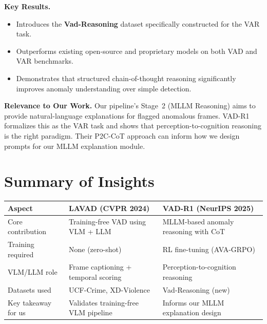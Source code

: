 \documentclass[12pt, a4paper]{article}
\begin{document}
\textbf{Key Results.}
\begin{itemize}[leftmargin=1.5em]
    \item Introduces the \textbf{Vad-Reasoning} dataset specifically constructed for the VAR task.
    \item Outperforms existing open-source and proprietary models on both VAD and VAR benchmarks.
    \item Demonstrates that structured chain-of-thought reasoning significantly improves anomaly understanding over simple detection.
\end{itemize}

\textbf{Relevance to Our Work.}
Our pipeline's Stage~2 (MLLM Reasoning) aims to provide natural-language explanations for flagged anomalous frames. VAD-R1 formalizes this as the VAR task and shows that perception-to-cognition reasoning is the right paradigm. Their P2C-CoT approach can inform how we design prompts for our MLLM explanation module.

\vspace{1.5em}

\section{Summary of Insights}

\begin{table}[h!]
\centering
\renewcommand{\arraystretch}{1.3}
\begin{tabularx}{\textwidth}{@{}l X X@{}}
    \toprule
    \textbf{Aspect} & \textbf{LAVAD (CVPR 2024)} & \textbf{VAD-R1 (NeurIPS 2025)} \\
    \midrule
    Core contribution & Training-free VAD using VLM + LLM & MLLM-based anomaly reasoning with CoT \\
    Training required & None (zero-shot) & RL fine-tuning (AVA-GRPO) \\
    VLM/LLM role & Frame captioning + temporal scoring & Perception-to-cognition reasoning \\
    Datasets used & UCF-Crime, XD-Violence & Vad-Reasoning (new) \\
    Key takeaway for us & Validates training-free VLM pipeline & Informs our MLLM explanation design \\
    \bottomrule
\end{tabularx}
\end{table}
\end{document}
